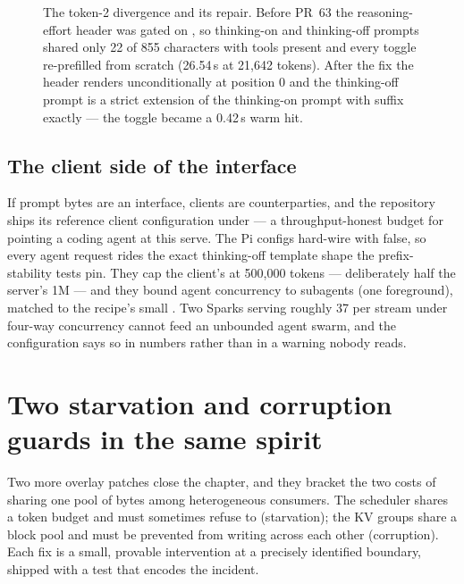 \begin{figure}[htbp]
{%
}
\caption{The token-2 divergence and its repair. Before PR~63 the
reasoning-effort header was gated on , so thinking-on
and thinking-off prompts shared only 22 of 855 characters with tools present
and every toggle re-prefilled from scratch (26.54\,s at 21{,}642 tokens).
After the fix the header renders unconditionally at position 0 and the
thinking-off prompt is a strict extension of the thinking-on prompt with
suffix exactly  --- the toggle became a 0.42\,s warm hit.}
\label{fig:proof-divergence}
\end{figure}

\subsection{The client side of the interface}

If prompt bytes are an interface, clients are counterparties, and the repository
ships its reference client configuration under  --- a
throughput-honest budget for pointing a coding agent at this serve. The Pi
configs hard-wire  with 
false, so every agent request rides the exact thinking-off template shape the
prefix-stability tests pin. They cap the client's  at
500{,}000 tokens --- deliberately half the server's 1M
 --- and they bound agent concurrency to
 subagents (one foreground), matched to the recipe's
small . Two Sparks serving roughly 37 \tokspersec{} per
stream under four-way concurrency cannot feed an unbounded agent swarm, and
the configuration says so in numbers rather than in a warning nobody reads.

\section{Two starvation and corruption guards in the same spirit}
\label{sec:proof-guards}

Two more overlay patches close the chapter, and they bracket the two costs
of sharing one pool of bytes among heterogeneous consumers. The scheduler
shares a token budget and must sometimes refuse to (starvation); the KV
groups share a block pool and must be prevented from writing across each
other (corruption). Each fix is a small, provable intervention at a
precisely identified boundary, shipped with a test that encodes the
incident.

